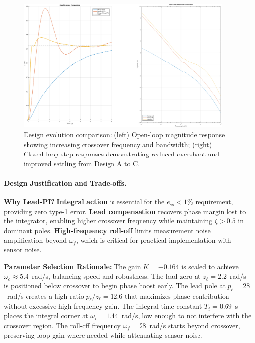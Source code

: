 \begin{figure}[h!]
\centering
\includegraphics[width=0.95\textwidth]{../MATLAB/LaTeX_Exports/design_comparison.pdf}
\caption{Design evolution comparison: (left) Open-loop magnitude response showing increasing crossover frequency and bandwidth; (right) Closed-loop step responses demonstrating reduced overshoot and improved settling from Design A to C.}
\label{fig:design_comparison}
\end{figure}

\paragraph{Design Justification and Trade-offs.}

\textbf{Why Lead-PI?} \textbf{Integral action} is essential for the $e_{ss} < 1\%$ requirement, providing zero type-1 error. \textbf{Lead compensation} recovers phase margin lost to the integrator, enabling higher crossover frequency while maintaining $\zeta > 0.5$ in dominant poles. \textbf{High-frequency roll-off} limits measurement noise amplification beyond $\omega_f$, which is critical for practical implementation with sensor noise.

\textbf{Parameter Selection Rationale:} The gain $K=-0.164$ is scaled to achieve $\omega_c \approx 5.4$~rad/s, balancing speed and robustness. The lead zero at $z_\ell = 2.2$~rad/s is positioned below crossover to begin phase boost early. The lead pole at $p_\ell = 28$~rad/s creates a high ratio $p_\ell/z_\ell = 12.6$ that maximizes phase contribution without excessive high-frequency gain. The integral time constant $T_i = 0.69$~s places the integral corner at $\omega_i = 1.44$~rad/s, low enough to not interfere with the crossover region. The roll-off frequency $\omega_f = 28$~rad/s starts beyond crossover, preserving loop gain where needed while attenuating sensor noise.

